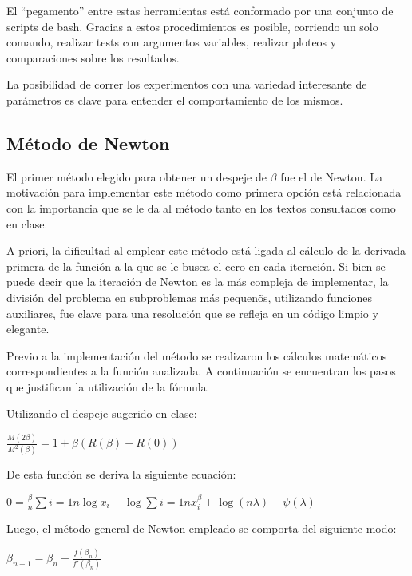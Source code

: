El ``pegamento'' entre estas herramientas est\'a conformado por una conjunto de
scripts de bash. Gracias a estos procedimientos es posible, corriendo un solo
comando, realizar tests con argumentos variables, realizar ploteos y
comparaciones sobre los resultados.

La posibilidad de correr los experimentos con una variedad interesante de
par\'ametros es clave para entender el comportamiento de los mismos.

\subsection{M\'etodo de Newton}

El primer m\'etodo elegido para obtener un despeje de $\beta$ fue el de Newton. 
La motivaci\'on para implementar este m\'etodo como primera opci\'on est\'a 
relacionada con la importancia que se le da al m\'etodo tanto en los textos 
consultados como en clase.

A priori, la dificultad al emplear este m\'etodo est\'a ligada al c\'alculo de 
la derivada primera de la funci\'on a la que se le busca el cero en cada 
iteraci\'on. Si bien se puede decir que la iteraci\'on de Newton es la m\'as 
compleja de implementar, la divisi\'on del problema en subproblemas 
m\'as pequen\~os, utilizando funciones auxiliares, fue clave para una 
resoluci\'on que se refleja en un c\'odigo limpio y elegante.

Previo a la implementaci\'on del m\'etodo se realizaron los c\'alculos 
matem\'aticos correspondientes a la funci\'on analizada. 
A continuaci\'on se encuentran los pasos que justifican la utilizaci\'on 
de la f\'ormula.

Utilizando el despeje sugerido en clase:

\begin{center}
$\frac{M(2\beta)}{M^2(\beta)}=1 + \beta(R(\beta)-R(0))$\\
\end{center}

De esta funci\'on se deriva la siguiente ecuaci\'on: 

\begin{center}
$0 = \frac{\beta}{n}\sum{i=1}{n}\log x_i - \log \sum{i=1}{n}x_i^{\beta} 
+ \log(n\lambda)-\psi(\lambda)$\\
\end{center}

Luego, el m\'etodo general de Newton empleado se comporta del siguiente modo: 
\begin{center}

$\beta_{n+1} = \beta_{n} - \frac{f(\beta_{n})}{f'(\beta_{n})}$\\

\end{center}

